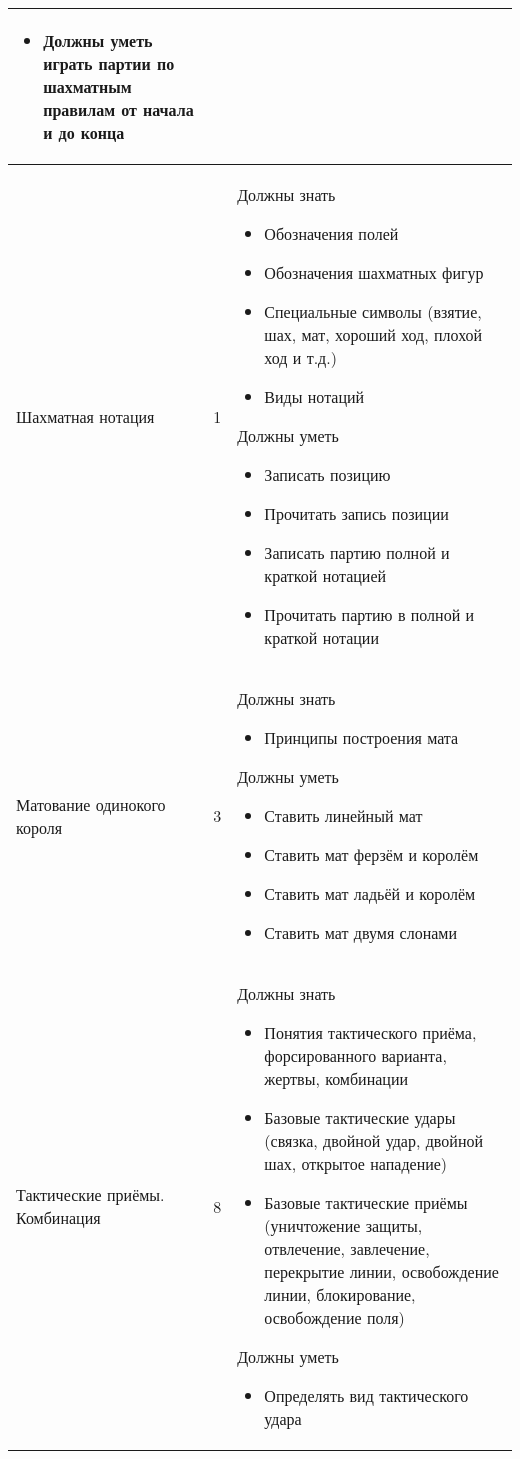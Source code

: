 \begin{center}
\begin{longtable}{ p{} | p{} | p{} }
\begin{itemize}
\item Должны уметь играть партии по шахматным правилам от начала и до конца
\end{itemize} \\ \hline
Шахматная нотация & 1 & Должны знать
\begin{itemize}
\item Обозначения полей
\item Обозначения шахматных фигур
\item Специальные символы (взятие, шах, мат, хороший ход, плохой ход и т.д.)
\item Виды нотаций
\end{itemize}
Должны уметь
\begin{itemize}
\item Записать позицию
\item Прочитать запись позиции
\item Записать партию полной и краткой нотацией 
\item Прочитать партию в полной и краткой нотации
\end{itemize} \\ \hline
Матование одинокого короля & 3 & Должны знать
\begin{itemize}
\item Принципы построения мата
\end{itemize}
Должны уметь
\begin{itemize}
\item Ставить линейный мат
\item Ставить мат ферзём и королём
\item Ставить мат ладьёй и королём
\item Ставить мат двумя слонами
\end{itemize} \\ \hline
Тактические приёмы. Комбинация & 8 & Должны знать
\begin{itemize}
\item Понятия тактического приёма, форсированного варианта, жертвы, комбинации
\item Базовые тактические удары (связка, двойной удар, двойной шах, открытое нападение)
\item Базовые тактические приёмы (уничтожение защиты, отвлечение, завлечение, перекрытие линии, освобождение линии, блокирование, освобождение поля)
\end{itemize}
Должны уметь
\begin{itemize}
\item Определять вид тактического удара

\end{itemize}
\end{longtable}
\end{center}
